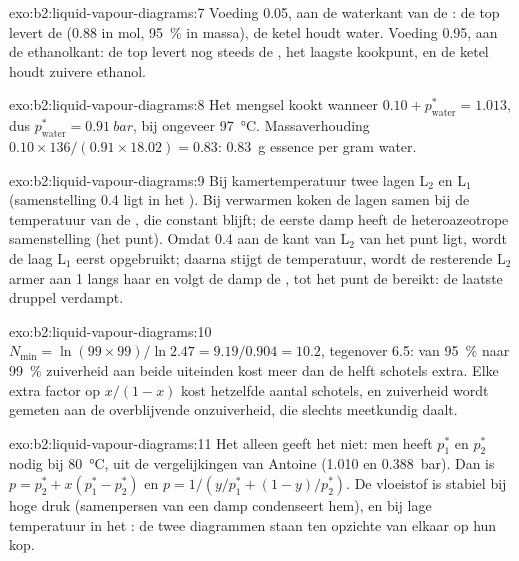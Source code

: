 \begin{solution}{exo:b2:liquid-vapour-diagrams:7}
Voeding 0.05, aan de waterkant van de : de top levert de 
(0.88 in mol, 95~\% in massa), de ketel houdt water. Voeding 0.95, aan de
ethanolkant: de top levert nog steeds de , het laagste kookpunt,
en de ketel houdt zuivere ethanol.
\end{solution}

\begin{solution}{exo:b2:liquid-vapour-diagrams:8}
Het mengsel kookt wanneer $0.10 + p^*_{\text{water}} = 1.013$, dus
$p^*_{\text{water}} = \qty{0.91}{bar}$, bij ongeveer \qty{97}{\degreeCelsius}. Massaverhouding
$0.10 \times 136/(0.91 \times 18.02) = 0.83$: \qty{0.83}{g} essence per gram
water.
\end{solution}

\begin{solution}{exo:b2:liquid-vapour-diagrams:9}
Bij kamertemperatuur twee lagen L$_2$ en L$_1$ (samenstelling 0.4 ligt in het
). Bij verwarmen koken de lagen samen bij de temperatuur van de
, die constant blijft; de eerste damp heeft de heteroazeotrope
samenstelling (het punt). Omdat 0.4 aan de kant van L$_2$ van het punt ligt, wordt de laag
L$_1$ eerst opgebruikt; daarna stijgt de temperatuur, wordt de resterende L$_2$
armer aan 1 langs haar  en volgt de damp de , tot
het punt de  bereikt: de laatste druppel verdampt.
\end{solution}

\begin{solution}{exo:b2:liquid-vapour-diagrams:10}
$N_{\min} = \ln(99 \times 99)/\ln 2.47 = 9.19/0.904 = 10.2$, tegenover 6.5: van
95~\% naar 99~\% zuiverheid aan beide uiteinden kost meer dan de helft
schotels extra. Elke extra factor op $x/(1 - x)$ kost hetzelfde aantal schotels, en
zuiverheid wordt gemeten aan de overblijvende onzuiverheid, die slechts meetkundig daalt.
\end{solution}

\begin{solution}{exo:b2:liquid-vapour-diagrams:11}
Het  alleen geeft het niet: men heeft $p_1^*$ en $p_2^*$ nodig bij
\qty{80}{\degreeCelsius}, uit de vergelijkingen van Antoine (1.010 en
\qty{0.388}{bar}). Dan is $p = p_2^* + x(p_1^* - p_2^*)$ en $p = 1/(y/p_1^* + (1 -
y)/p_2^*)$. De vloeistof is stabiel bij hoge druk (samenpersen van een damp
condenseert hem), en bij lage temperatuur in het : de twee diagrammen
staan ten opzichte van elkaar op hun kop.
\end{solution}

